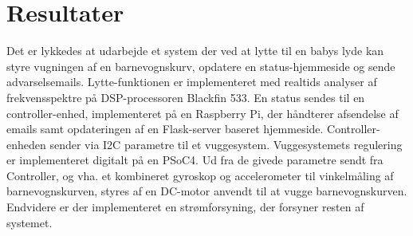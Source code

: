 \chapter{Resultater}

Det er lykkedes at udarbejde et system der ved at lytte til en babys lyde kan styre vugningen af en barnevognskurv, opdatere en status-hjemmeside og sende advarselsemails. Lytte-funktionen er implementeret med realtids analyser af frekvensspektre på DSP-processoren Blackfin 533. En status sendes til en controller-enhed, implementeret på en Raspberry Pi, der håndterer afsendelse af emails samt opdateringen af en Flask-server baseret hjemmeside. Controller-enheden sender via I2C parametre til et vuggesystem. Vuggesystemets regulering er implementeret digitalt på en PSoC4. Ud fra de givede parametre sendt fra Controller, og vha. et kombineret gyroskop og accelerometer til vinkelmåling af barnevognskurven, styres af en DC-motor anvendt til at vugge barnevognskurven. Endvidere er der implementeret en strømforsyning, der forsyner resten af systemet.